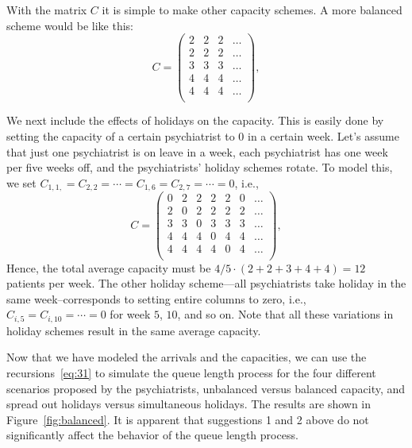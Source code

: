 With the matrix $C$ it is simple to make other capacity schemes. A
more balanced scheme would be like this:
\begin{equation*}
C = 
  \begin{pmatrix}
    2 & 2 & 2 & \ldots\\
    2 & 2 & 2 & \ldots\\
    3 & 3 & 3 & \ldots\\
    4 & 4 & 4 & \ldots\\
    4 & 4 & 4 & \ldots\\
  \end{pmatrix},
\end{equation*}

We next include the effects of holidays on the capacity. This is
easily done by setting the capacity of a certain psychiatrist to 0 in
a certain week. Let's assume that just one psychiatrist is on leave in
a week, each psychiatrist has one week per five weeks off, and the
psychiatrists' holiday schemes rotate. To model this, we set
$C_{1,1,}=C_{2,2}=\cdots=C_{1,6}=C_{2,7} =\cdots = 0$, i.e.,
\begin{equation*}
C = 
  \begin{pmatrix}
    0 & 2 & 2 & 2 & 2 & 0 & \ldots \\
    2 & 0 & 2 & 2 & 2 & 2 & \ldots\\
    3 & 3 & 0 & 3 & 3 & 3 & \ldots\\
    4 & 4 & 4 & 0 & 4 & 4 & \ldots\\
    4 & 4 & 4 & 4 & 0 & 4 & \ldots\\
  \end{pmatrix},
\end{equation*}
Hence, the total average capacity must be $4/5 \cdot (2+2+3+4+4) = 12$
patients per week.  The other holiday scheme---all psychiatrists take
holiday in the same week--corresponds to setting entire columns to
zero, i.e., $C_{i,5}=C_{i,10}=\cdots=0$ for week $5$, $10$, and so
on. Note that all these variations in holiday schemes result in the
same average capacity.

Now that we have modeled the arrivals and the capacities, we can use
the recursions~\eqref{eq:31} to simulate the queue length process for
the four different scenarios proposed by the psychiatrists, unbalanced
versus balanced capacity, and spread out holidays versus simultaneous
holidays.  The results are shown in Figure~\ref{fig:balanced}. It is
apparent that suggestions 1 and 2 above do not significantly affect
the behavior of the queue length process.  



